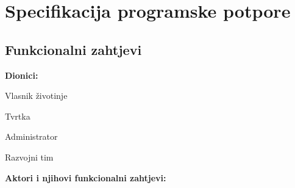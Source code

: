 \chapter{Specifikacija programske potpore}
		
	\section{Funkcionalni zahtjevi}
			
			\noindent \textbf{Dionici:}
			
			\begin{packed_enum}
				
				\item Vlasnik životinje
				\item Tvrtka				
				\item Administrator
				\item Razvojni tim
				
			\end{packed_enum}
			
			\noindent \textbf{Aktori i njihovi funkcionalni zahtjevi:}
			

